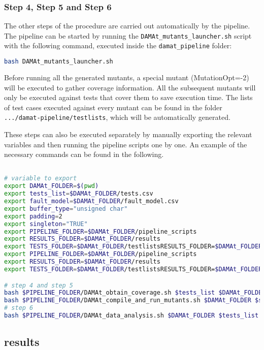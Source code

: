 \subsubsection{Step 4, Step 5 and Step 6}

The other steps of the \DAMA procedure are carried out automatically by the pipeline.
The pipeline can be started by running the \texttt{DAMAt\_mutants\_launcher.sh} script with the following command, executed inside the \texttt{damat\_pipeline} folder:

\begin{lstlisting}[language=bash]
bash DAMAt_mutants_launcher.sh
\end{lstlisting}

Before running all the generated mutants, a special mutant (MutationOpt=-2) will be executed to gather coverage information.
All the subsequent mutants will only be executed against tests that cover them to save execution time.
The lists of test cases executed against every mutant can be found in the folder \texttt{.../damat-pipeline/testlists}, which will be automatically generated.

These steps can also be executed separately by manually exporting the relevant variables and then running the pipeline scripts one by one. An example of the necessary commands can be found in the following.

\begin{lstlisting}[label={lst:manual_commands}, language=bash]

# variable to export
export DAMAt_FOLDER=$(pwd)
export tests_list=$DAMAt_FOLDER/tests.csv
export fault_model=$DAMAt_FOLDER/fault_model.csv
export buffer_type="unsigned char"
export padding=2
export singleton="TRUE"
export PIPELINE_FOLDER=$DAMAt_FOLDER/pipeline_scripts
export RESULTS_FOLDER=$DAMAt_FOLDER/results
export TESTS_FOLDER=$DAMAt_FOLDER/testlistsRESULTS_FOLDER=$DAMAt_FOLDER/results
export PIPELINE_FOLDER=$DAMAt_FOLDER/pipeline_scripts
export RESULTS_FOLDER=$DAMAt_FOLDER/results
export TESTS_FOLDER=$DAMAt_FOLDER/testlistsRESULTS_FOLDER=$DAMAt_FOLDER/results

# step 4 and step 5
bash $PIPELINE_FOLDER/DAMAt_obtain_coverage.sh $tests_list $DAMAt_FOLDER $singleton
bash $PIPELINE_FOLDER/DAMAt_compile_and_run_mutants.sh $DAMAt_FOLDER $singleton
# step 6
bash $PIPELINE_FOLDER/DAMAt_data_analysis.sh $DAMAt_FOLDER $tests_list

\end{lstlisting}


\subsection{\DAMA results}

